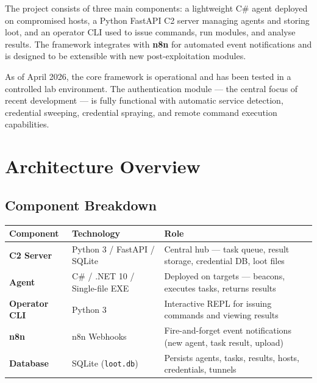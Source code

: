 \documentclass[11pt,a4paper]{article}
\newcommand{\theadrow}{\rowcolor{dark}\color{white}\bfseries}
\begin{document}
\vspace{4pt}

The project consists of three main components: a lightweight C\# agent deployed on compromised hosts, a Python FastAPI C2 server managing agents and storing loot, and an operator CLI used to issue commands, run modules, and analyse results. The framework integrates with \textbf{n8n} for automated event notifications and is designed to be extensible with new post-exploitation modules.

As of April 2026, the core framework is operational and has been tested in a controlled lab environment. The authentication module --- the central focus of recent development --- is fully functional with automatic service detection, credential sweeping, credential spraying, and remote command execution capabilities.

\section{Architecture Overview}

\subsection{Component Breakdown}

\vspace{4pt}
\begin{tabularx}{\linewidth}{L{2.8cm} L{3.8cm} X}
\toprule
\theadrow Component & Technology & Role \\
\midrule
\textbf{C2 Server}    & Python 3 / FastAPI / SQLite       & Central hub --- task queue, result storage, credential DB, loot files \\
\textbf{Agent}        & C\# / .NET 10 / Single-file EXE   & Deployed on targets --- beacons, executes tasks, returns results \\
\textbf{Operator CLI} & Python 3                          & Interactive REPL for issuing commands and viewing results \\
\textbf{n8n}          & n8n Webhooks                      & Fire-and-forget event notifications (new agent, task result, upload) \\
\textbf{Database}     & SQLite (\texttt{loot.db})         & Persists agents, tasks, results, hosts, credentials, tunnels \\
\bottomrule
\end{tabularx}
\end{document}
